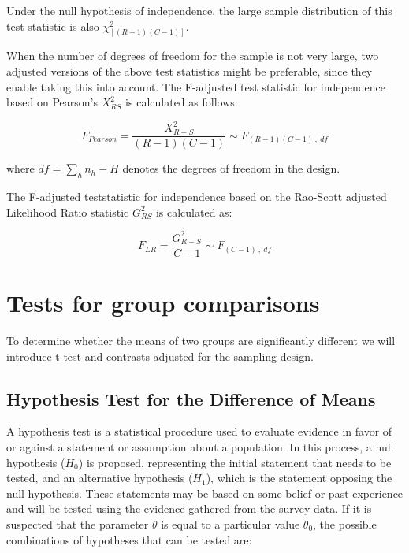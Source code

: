 \documentclass[
  12pt,
]{book}
\begin{document}
Under the null hypothesis of independence, the large sample distribution of this test statistic is also \(\chi^2_{[(R-1) (C-1)]}\).

When the number of degrees of freedom for the sample is not very large, two adjusted versions of the above test statistics might be preferable, since they enable taking this into account. The F-adjusted test statistic for independence based on Pearson's \(X_{RS}^2\) is calculated as follows:

\[
F_{Pearson} = \frac{X^{2}_{R-S}}{(R-1)(C-1)} \sim F_{\left(R-1\right)\left(C-1\right) \ , \ df}
\]

where \(df = \sum_{h} n_h - H\) denotes the degrees of freedom in the design.

The F-adjusted teststatistic for independence based on the Rao-Scott adjusted Likelihood Ratio statistic \(G_{RS}^{2}\) is calculated as:

\[
F_{LR} = \frac{G^{2}_{R-S}}{C-1} \sim F_{\left(C-1\right) \ , \ df}
\]

\hypertarget{tests-for-group-comparisons}{%
\section{Tests for group comparisons}\label{tests-for-group-comparisons}}

To determine whether the means of two groups are significantly different we will introduce t-test and contrasts adjusted for the sampling design.

\hypertarget{hypothesis-test-for-the-difference-of-means}{%
\subsection{Hypothesis Test for the Difference of Means}\label{hypothesis-test-for-the-difference-of-means}}

A hypothesis test is a statistical procedure used to evaluate evidence in favor of or against a statement or assumption about a population. In this process, a null hypothesis (\(H_0\)) is proposed, representing the initial statement that needs to be tested, and an alternative hypothesis (\(H_1\)), which is the statement opposing the null hypothesis. These statements may be based on some belief or past experience and will be tested using the evidence gathered from the survey data. If it is suspected that the parameter \(\theta\) is equal to a particular value \(\theta_{0}\), the possible combinations of hypotheses that can be tested are:
\end{document}
